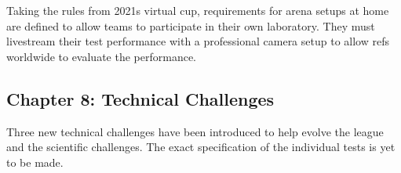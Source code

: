 Taking the rules from 2021s virtual cup, 
requirements for arena setups at home are defined to allow teams to participate in their own laboratory.
They must livestream their test performance with a professional camera setup to allow refs worldwide to evaluate the performance.

\subsection{Chapter 8: Technical Challenges}

Three new technical challenges have been introduced to help evolve the league and the scientific challenges. 
The exact specification of the individual tests is yet to be made.
	
